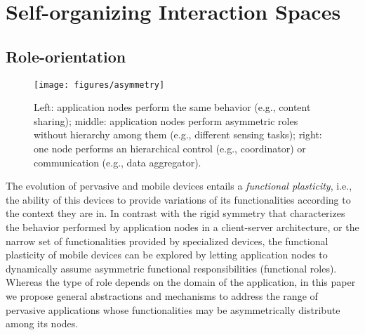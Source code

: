 \section{Self-organizing Interaction Spaces}\label{sec:edge_spaces}

\subsection{Role-orientation}

\begin{figure}[t!]
	\centering
	\texttt{[image: figures/asymmetry]}
	\caption{Left: application nodes perform the same behavior (e.g., content sharing); middle: application nodes perform asymmetric roles without hierarchy among them (e.g., different sensing tasks); right: one node performs an hierarchical control (e.g., coordinator) or communication (e.g., data aggregator).}
	\label{fig:asymmetry}
\end{figure}

The evolution of pervasive and mobile devices entails a \textit{functional plasticity}, i.e., the ability of this devices to provide variations of its functionalities according to the context they are in. In contrast with the rigid symmetry that characterizes the behavior performed by application nodes in a client-server architecture, or the narrow set of functionalities provided by specialized devices, the functional plasticity of mobile devices can be explored by letting application nodes to dynamically assume asymmetric functional responsibilities (functional roles). Whereas the type of role depends on the domain of the application, in this paper we propose general abstractions and mechanisms to address the range of pervasive applications whose functionalities may be asymmetrically distribute among its nodes. 





